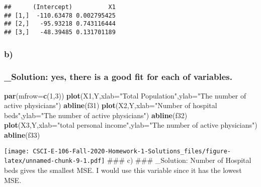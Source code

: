 \documentclass[
]{article}
\newenvironment{Shaded}{\begin{snugshade}}{\end{snugshade}}
\newcommand{\DataTypeTok}[1]{\textcolor[rgb]{0.13,0.29,0.53}{#1}}
\newcommand{\DecValTok}[1]{\textcolor[rgb]{0.00,0.00,0.81}{#1}}
\newcommand{\KeywordTok}[1]{\textcolor[rgb]{0.13,0.29,0.53}{\textbf{#1}}}
\newcommand{\NormalTok}[1]{#1}
\newcommand{\OperatorTok}[1]{\textcolor[rgb]{0.81,0.36,0.00}{\textbf{#1}}}
\newcommand{\StringTok}[1]{\textcolor[rgb]{0.31,0.60,0.02}{#1}}
\begin{document}
\begin{verbatim}
##      (Intercept)          X1
## [1,]  -110.63478 0.002795425
## [2,]   -95.93218 0.743116444
## [3,]   -48.39485 0.131701189
\end{verbatim}

\hypertarget{b-2}{%
\subsubsection{b)}\label{b-2}}

\hypertarget{solution-yes-there-is-a-good-fit-for-each-of-variables.}{%
\subsubsection{\_Solution: yes, there is a good fit for each of
variables.}\label{solution-yes-there-is-a-good-fit-for-each-of-variables.}}

\begin{Shaded}
\begin{Highlighting}[]
\KeywordTok{par}\NormalTok{(}\DataTypeTok{mfrow=}\KeywordTok{c}\NormalTok{(}\DecValTok{1}\NormalTok{,}\DecValTok{3}\NormalTok{))}
\KeywordTok{plot}\NormalTok{(X1,Y,}\DataTypeTok{xlab=}\StringTok{"Total Population"}\NormalTok{,}\DataTypeTok{ylab=}\StringTok{"The number of active physicians"}\NormalTok{)}
\KeywordTok{abline}\NormalTok{(f31)}
\KeywordTok{plot}\NormalTok{(X2,Y,}\DataTypeTok{xlab=}\StringTok{"Number of hospital beds"}\NormalTok{,}\DataTypeTok{ylab=}\StringTok{"The number of active physicians"}\NormalTok{)}
\KeywordTok{abline}\NormalTok{(f32)}
\KeywordTok{plot}\NormalTok{(X3,Y,}\DataTypeTok{xlab=}\StringTok{"total personal income"}\NormalTok{,}\DataTypeTok{ylab=}\StringTok{"The number of active physicians"}\NormalTok{)}
\KeywordTok{abline}\NormalTok{(f33)}
\end{Highlighting}
\end{Shaded}

\texttt{[image: CSCI-E-106-Fall-2020-Homework-1-Solutions\_files/figure-latex/unnamed-chunk-9-1.pdf]}
\#\#\# c) \#\#\# \_Solution: Number of Hospital beds gives the smallest
MSE. I would use this variable since it has the lowest MSE.

\begin{Shaded}
\end{Shaded}
\end{document}
